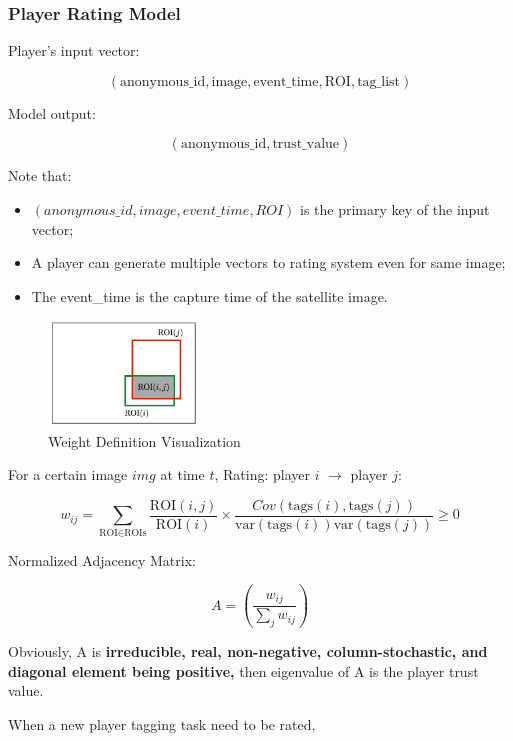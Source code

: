 \documentclass[paper=a4, fontsize=11pt]{scrartcl} %
\numberwithin{equation}{section} %
\numberwithin{figure}{section} %
\numberwithin{table}{section} %
\begin{document}
    \subsubsection{Player Rating Model}

    Player’s input vector: 
    
    \[
    (\text{anonymous\_id}, \text{image}, \text{event\_time}, \text{ROI}, \text{tag\_list})
    \]

    Model output: 
    
    \[
    (\text{anonymous\_id}, \text{trust\_value})
    \]

    Note that:

    \begin{itemize}
      \item $(anonymous\_id, image, event\_time, ROI)$ is the primary key of the input vector;
      \item A player can generate multiple vectors to rating system even for same image;
      \item The event\_time is the capture time of the satellite image.
    \end{itemize}

    \begin{figure}[htp]
    \centering
    \includegraphics[width=4cm]{figures/weight-define}
    \caption{Weight Definition Visualization}
    \label{fig:roiweight}
    \end{figure}

    For a certain image $img$ at time $t$, Rating: player $i$ $\rightarrow$ player $j$:

    \[
    w_{ij}=\sum_{\text{ROI}\in \text{ROIs}}\frac{\text{ROI}(i,j)}{\text{ROI}(i)} \times \frac{Cov(\text{tags}(i), \text{tags}(j))}{\text{var}(\text{tags}(i))\text{var}(\text{tags}(j))} \geq 0
    \]

    Normalized Adjacency Matrix:

    \[
    A = (\frac{w_{ij}}{\sum_{j}{w_{ij}}})
    \]

    Obviously, A is \textbf{irreducible, real, non-negative, column-stochastic, and diagonal element being positive,} then eigenvalue of A is the player trust value.

    When a new player tagging task need to be rated,
\end{document}
